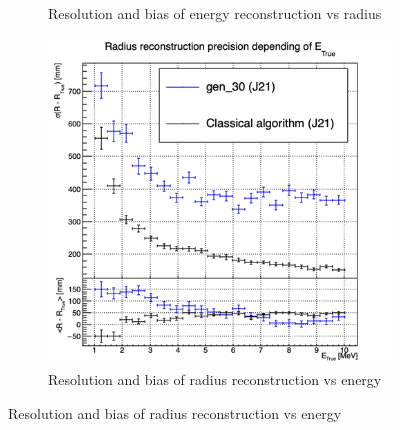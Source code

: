\documentclass[../main.tex]{subfiles}
\begin{document}
\begin{figure}[ht]
\begin{subfigure}[t]{0.32\linewidth}
    \caption{Resolution and bias of energy reconstruction vs radius}
    \label{fig:jcnn:vic_cnn:multi_vic_cnn_MESBvRTC}
  \end{subfigure}
  \begin{subfigure}[t]{0.32\linewidth}
    \centering
    \includegraphics[width=\linewidth]{images/jcnn/vic_cnn/multi_vic_cnn_MSBvETC.png}
    \caption{Resolution and bias of radius reconstruction vs energy}
    \label{fig:jcnn:vic_cnn:multi_vic_cnn_MSBvETC}
  \end{subfigure}



\end{figure}
\end{document}
